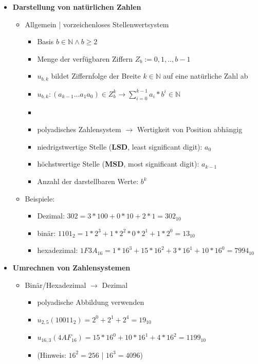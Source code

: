 \documentclass[11pt,a4paper]{article}
\begin{document}
\begin{itemize}

\item \textbf{Darstellung von natürlichen Zahlen}
	\begin{itemize}
	\item Allgemein | vorzeichenloses Stellenwertsystem
		\begin{itemize}
		\item Basis $b \in \mathbb{N} \land b \geq 2$
		\item Menge der verfügbaren Ziffern $Z_b := {0,1,..,b - 1}$
		\item $u_{b,k}$ bildet Ziffernfolge der Breite $k \in \mathbb{N}$ auf eine natürliche Zahl ab 
		\item $u_{b,k} : (a_{k-1}...a_1a_0) \in Z^k_b \rightarrow \sum^{k-1}_{i=0} a_i * b^i \in \mathbb{N}$
		\item[]
		\item polyadisches Zahlensystem $\rightarrow$ Wertigkeit von Position abhängig
		\item niedrigstwertige Stelle (\textbf{LSD}, least significant digit): $a_0$
		\item höchstwertige Stelle (\textbf{MSD}, most significant digit): $a_{k-1}$
		\item Anzahl der darstellbaren Werte: $b^k$
		\end{itemize}
	
	\item Beispiele:
		\begin{itemize}
		\item Dezimal: $302 = 3 * 100 + 0 * 10 + 2 * 1 = 302_{10}$
		\item binär: $1101_2 = 1 * 2^3 + 1 * 2^2 * 0 * 2^1 + 1 * 2^0 = 13_{10}$
		\item hexadezimal: $1F3A_16 = 1 * 16^3 + 15 * 16^2 + 3 * 16^1 + 10 * 16^0 = 7994_{10}$
		\end{itemize}
	\end{itemize}

\item \textbf{Umrechnen von Zahlensystemen}
	\begin{itemize}
	\item Binär/Hexadezimal $\rightarrow$ Dezimal
		\begin{itemize}
		\item polyadische Abbildung verwenden
		\item $u_{2,5}(1 0011_2) = 2^0 + 2^1 + 2^4 = 19_{10}$
		\item $u_{16,3}(4AF_{16}) = 15 *16^0 + 10 * 16^1 + 4 * 16^2 = 1199_{10}$
		\item (Hinweis: $16^2 = 256$ | $16^3 = 4096$)
		\end{itemize}
	

\end{itemize}
\end{itemize}
\end{document}
